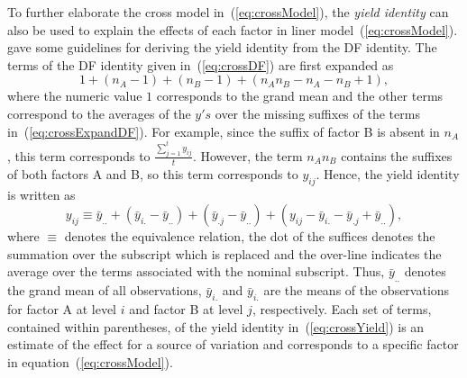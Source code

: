 \documentclass[article]{jss}
\begin{document}
To further elaborate the cross model in~(\ref{eq:crossModel}), the \emph{yield identity} can also be used to explain the effects of each factor in liner model~(\ref{eq:crossModel}). \cite{Nelder1965A} gave some guidelines for deriving the yield identity from the DF identity. The terms of the DF identity given in~(\ref{eq:crossDF}) are first expanded as
\begin{equation}\label{eq:crossExpandDF}
1 + (n_A - 1) + (n_B - 1) + (n_A n_B - n_A - n_B + 1),
\end{equation} 
where the numeric value $1$ corresponds to the grand mean and the other terms correspond to the averages of the $y's$ over the missing suffixes of the terms in~(\ref{eq:crossExpandDF}). For example, since the suffix of factor B is absent in $n_A$, this term corresponds to $\displaystyle \frac{\sum_{j=1}^t y_{ij}}{t}$. However, the term $n_A n_B$ contains the suffixes of both factors A and B, so this term corresponds to $y_{ij}$. Hence, the yield identity is written as
\begin{equation}\label{eq:crossYield}
y_{ij} \equiv \bar{y}_{..} + (\bar{y}_{i.} - \bar{y}_{..}) + (\bar{y}_{.j} - \bar{y}_{..}) +(y_{ij} - \bar{y}_{i.} - \bar{y}_{.j} + \bar{y}_{..}),
\end{equation}
where $\equiv$ denotes the equivalence relation, the dot of the suffices denotes the summation over the subscript which is replaced and the over-line indicates the average over the terms associated with the nominal subscript. Thus, $\bar{y}_{..}$ denotes the grand mean of all observations, $\bar{y}_{i.}$ and $\bar{y}_{i.}$ are the means of the observations for factor A at level $i$ and factor B at level $j$, respectively. Each set of terms, contained within parentheses, of the yield identity in~(\ref{eq:crossYield}) is an estimate of the effect for a source of variation and corresponds to a specific factor in equation~(\ref{eq:crossModel}).
\end{document}

